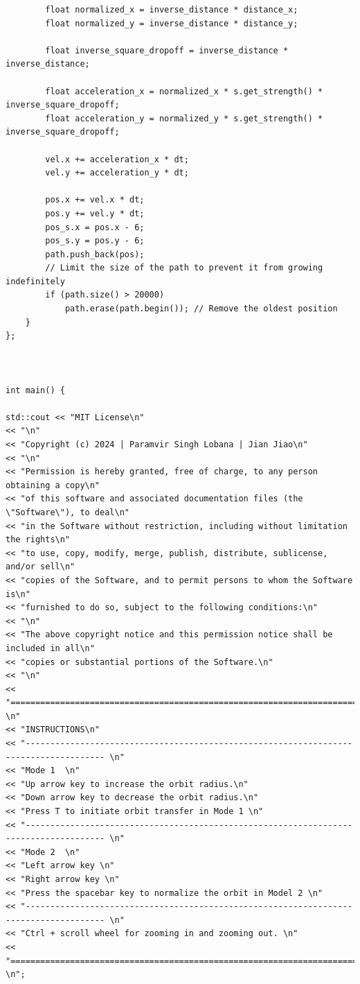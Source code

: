 \documentclass[12pt, letter]{article}
\begin{document}
\begin{verbatim}
		float normalized_x = inverse_distance * distance_x;
		float normalized_y = inverse_distance * distance_y;

		float inverse_square_dropoff = inverse_distance * inverse_distance;

		float acceleration_x = normalized_x * s.get_strength() * inverse_square_dropoff;
		float acceleration_y = normalized_y * s.get_strength() * inverse_square_dropoff;

		vel.x += acceleration_x * dt;
		vel.y += acceleration_y * dt;

		pos.x += vel.x * dt;
		pos.y += vel.y * dt;
		pos_s.x = pos.x - 6;
		pos_s.y = pos.y - 6;
		path.push_back(pos);
		// Limit the size of the path to prevent it from growing indefinitely
		if (path.size() > 20000)
			path.erase(path.begin()); // Remove the oldest position
	}
};



int main() {

std::cout << "MIT License\n"
<< "\n"
<< "Copyright (c) 2024 | Paramvir Singh Lobana | Jian Jiao\n"
<< "\n"
<< "Permission is hereby granted, free of charge, to any person obtaining a copy\n"
<< "of this software and associated documentation files (the \"Software\"), to deal\n"
<< "in the Software without restriction, including without limitation the rights\n"
<< "to use, copy, modify, merge, publish, distribute, sublicense, and/or sell\n"
<< "copies of the Software, and to permit persons to whom the Software is\n"
<< "furnished to do so, subject to the following conditions:\n"
<< "\n"
<< "The above copyright notice and this permission notice shall be included in all\n"
<< "copies or substantial portions of the Software.\n"
<< "\n"
<< "====================================================================================== \n"
<< "INSTRUCTIONS\n"
<< "-------------------------------------------------------------------------------------- \n"
<< "Mode 1  \n"
<< "Up arrow key to increase the orbit radius.\n"
<< "Down arrow key to decrease the orbit radius.\n"
<< "Press T to initiate orbit transfer in Mode 1 \n"
<< "-------------------------------------------------------------------------------------- \n"
<< "Mode 2  \n"
<< "Left arrow key \n"
<< "Right arrow key \n"
<< "Press the spacebar key to normalize the orbit in Model 2 \n"
<< "-------------------------------------------------------------------------------------- \n"
<< "Ctrl + scroll wheel for zooming in and zooming out. \n"
<< "====================================================================================== \n";



\end{verbatim}
\end{document}
